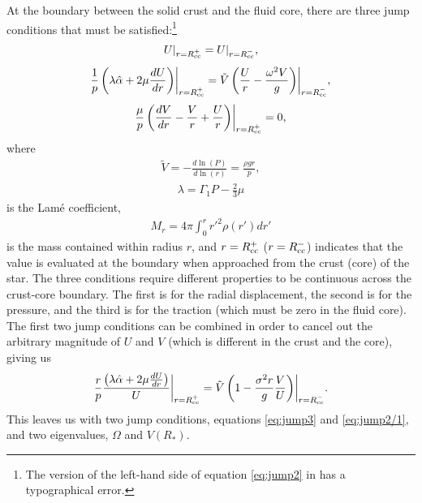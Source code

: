 \documentclass[fleqn,usenatbib]{mnras}
\begin{document}

At the boundary between the solid crust and the fluid core, there are three jump conditions that must be satisfied:\footnote{The version of the left-hand side of equation \ref{eq:jump2} in \citet{mcdermott1988nonradial} has a typographical error.}
\begin{align}
U\rvert_{r=R_{\rm cc}^{+}}=U\rvert_{r=R_{\rm cc}^{-}},
\label{eq:jump1}
\end{align}
\begin{align}
\frac{1}{p}\left(\lambda\hat{\alpha}+2\mu\frac{dU}{dr}\right)\biggr\rvert_{r=R_{\rm cc}^{+}}=\tilde{V}\left(\frac{U}{r}-\frac{\omega^2V}{g}\right)\biggr\rvert_{r=R_{\rm cc}^{-}},
\label{eq:jump2}
\end{align}
\begin{align}
\frac{\mu}{p}\left(\frac{dV}{dr}-\frac{V}{r}+\frac{U}{r}\right)\biggr\rvert_{r=R_{\rm cc}^{+}}=0,
\label{eq:jump3}
\end{align}
\noindent where 
\begin{align}
\tilde{V}=-\frac{d\ln\left(P\right)}{d\ln\left(r\right)}=\frac{\rho g r}{p},
\end{align}
\begin{align}
\lambda=\Gamma_1P-\frac{2}{3}\mu
\end{align}
\noindent is the Lam\'e coefficient, 
\begin{align}
M_r=4\pi\int^r_0 r'^2\rho(r')dr'
\label{eq:mass_r}
\end{align}
\noindent is the mass contained within radius $r$, and $r=R_{\rm cc}^{+}$ ($r=R_{\rm cc}^{-}$) indicates that the value is evaluated at the boundary when approached from the crust (core) of the star. The three conditions require different properties to be continuous across the crust-core boundary. The first is for the radial displacement, the second is for the pressure, and the third is for the traction (which must be zero in the fluid core). The first two jump conditions can be combined in order to cancel out the arbitrary magnitude of $U$ and $V$ (which is different in the crust and the core), giving us
\begin{align}
\frac{r}{p}\frac{\left(\lambda\hat{\alpha}+2\mu\frac{dU}{dr}\right)}{U}\biggr\rvert_{r=R_{\rm cc}^{+}}=\tilde{V}\left(1-\frac{\sigma^2r}{g}\frac{V}{U}\right)\biggr\rvert_{r=R_{\rm cc}^{-}}.
\label{eq:jump2/1}
\end{align}
\noindent This leaves us with two jump conditions, equations \ref{eq:jump3} and \ref{eq:jump2/1}, and two eigenvalues, $\Omega$ and $V(R_*)$.
\end{document}

